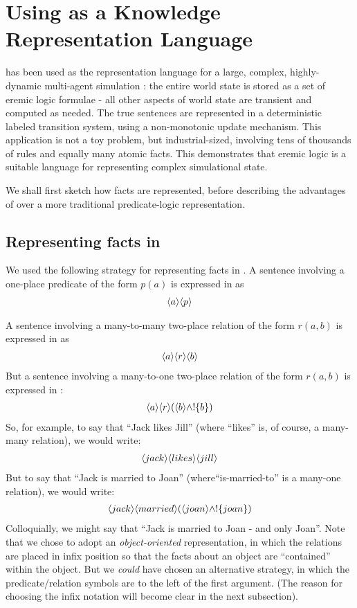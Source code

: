 \section{Using \ELFULL{} as a Knowledge Representation Language}\label{kr}


\ELFULL{} has been used as the representation language for a large,
complex, highly-dynamic multi-agent simulation \cite{evans-and-short}:
the entire world state is stored as a set of eremic logic formulae -
all other aspects of world state are transient and computed as needed.
The true sentences are represented in a deterministic labeled
transition system, using a non-monotonic update mechanism.  This
application is not a toy problem, but industrial-sized, involving tens
of thousands of rules and equally many atomic facts.  This
demonstrates that eremic logic is a suitable language for representing
complex simulational state.

We shall first sketch how facts are represented, before describing the
advantages of \ELABR{} over a more traditional predicate-logic
representation.

\subsection{Representing facts  in \ELABR{}}

We used the following strategy for representing facts in \ELABR{}.  A
sentence involving a one-place predicate of the form $p(a)$ is
expressed in \ELABR{} as
\begin{eqnarray*}
   \langle a \rangle \langle p \rangle \end{eqnarray*}

\NI A sentence involving a many-to-many two-place relation of the form
$r(a,b)$ is expressed in \ELABR{} as
\begin{eqnarray*}
\langle a \rangle \langle r \rangle \langle b \rangle \end{eqnarray*}
But a sentence involving a many-to-one two-place relation of the form $r(a,b)$ is expressed in \ELABR{}:
\begin{eqnarray*}
\langle a \rangle \langle r \rangle (\langle b \rangle \land ! \{b\})
\end{eqnarray*}
So, for example, to say that ``Jack likes Jill'' (where ``likes'' is, of course, a many-many relation), we would write:
\begin{eqnarray*}
\langle jack \rangle \langle likes \rangle \langle jill \rangle \end{eqnarray*}
But to say that ``Jack is married to Joan'' (where``is-married-to'' is a many-one relation), we would write:
\begin{eqnarray*}
\langle jack \rangle \langle married \rangle (\langle joan \rangle \land ! \{joan\})
\end{eqnarray*}
Colloquially, we might say that ``Jack is married to Joan - and only Joan''.
Note that we chose to adopt an \emph{object-oriented} representation, in which the relations are placed in infix position so that the facts about an object are ``contained'' within the object.
But we \emph{could} have chosen an alternative strategy, in which the predicate/relation symbols are to the left of the first argument. (The reason for choosing the infix notation will become clear in the next subsection).

